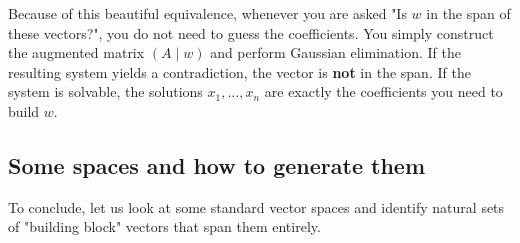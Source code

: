 \begin{remark}
Because of this beautiful equivalence, whenever you are asked "Is $w$ in the span of these vectors?", you do not need to guess the coefficients. You simply construct the augmented matrix $(A \mid w)$ and perform Gaussian elimination. If the resulting system yields a contradiction, the vector is \textbf{not} in the span. If the system is solvable, the solutions $x_1, \dots, x_n$ are exactly the coefficients you need to build $w$.
\end{remark}

\subsection{Some spaces and how to generate them}

To conclude, let us look at some standard vector spaces and identify natural sets of "building block" vectors that span them entirely.

